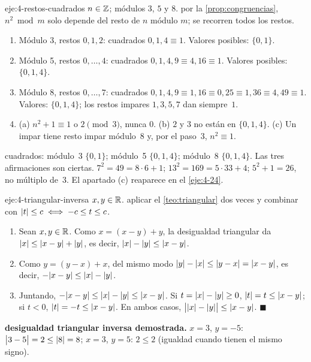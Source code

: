 \begin{solucion}{eje:4-restos-cuadrados}
\datos $n\in\mathbb{Z}$; módulos $3$, $5$ y $8$.
\planteamiento por la \cref{prop:congruencias}, $n^{2}\bmod m$ solo depende del resto de $n$ módulo $m$; se recorren todos los restos.
\pasos
\begin{enumerate}[label=\arabic*.]
  \item Módulo 3, restos $0,1,2$: cuadrados $0,1,4\equiv 1$. Valores posibles: $\{0,1\}$.
  \item Módulo 5, restos $0,\dots,4$: cuadrados $0,1,4,9\equiv 4,16\equiv 1$. Valores posibles: $\{0,1,4\}$.
  \item Módulo 8, restos $0,\dots,7$: cuadrados $0,1,4,9\equiv1,16\equiv0,25\equiv1,36\equiv4,49\equiv1$. Valores: $\{0,1,4\}$; los restos impares $1,3,5,7$ dan siempre~$1$.
  \item (a) $n^{2}+1\equiv 1$ o $2\pmod 3$, nunca $0$. (b) $2$ y $3$ no están en $\{0,1,4\}$. (c) Un impar tiene resto impar módulo~8 y, por el paso~3, $n^{2}\equiv 1$.
\end{enumerate}
\resultado cuadrados: módulo~3 $\{0,1\}$; módulo~5 $\{0,1,4\}$; módulo~8 $\{0,1,4\}$. Las tres afirmaciones son ciertas.
\comprobacion $7^{2}=49=8\cdot 6+1$; $13^{2}=169=5\cdot 33+4$; $5^{2}+1=26$, no múltiplo de~3. El apartado (c) reaparece en el \cref{eje:4-24}.
\end{solucion}

\begin{solucion}{eje:4-triangular-inversa}
\datos $x,y\in\mathbb{R}$.
\planteamiento aplicar el \cref{teo:triangular} dos veces y combinar con $\lvert t\rvert\le c\iff -c\le t\le c$.
\pasos
\begin{enumerate}[label=\arabic*.]
  \item Sean $x,y\in\mathbb{R}$. Como $x=(x-y)+y$, la desigualdad triangular da $\lvert x\rvert\le\lvert x-y\rvert+\lvert y\rvert$, es decir, $\lvert x\rvert-\lvert y\rvert\le\lvert x-y\rvert$.
  \item Como $y=(y-x)+x$, del mismo modo $\lvert y\rvert-\lvert x\rvert\le\lvert y-x\rvert=\lvert x-y\rvert$, es decir, $-\lvert x-y\rvert\le\lvert x\rvert-\lvert y\rvert$.
  \item Juntando, $-\lvert x-y\rvert\le\lvert x\rvert-\lvert y\rvert\le\lvert x-y\rvert$. Si $t=\lvert x\rvert-\lvert y\rvert\ge 0$, $\lvert t\rvert=t\le\lvert x-y\rvert$; si $t<0$, $\lvert t\rvert=-t\le\lvert x-y\rvert$. En ambos casos, $\bigl\lvert\lvert x\rvert-\lvert y\rvert\bigr\rvert\le\lvert x-y\rvert$. $\blacksquare$
\end{enumerate}
\resultado \textbf{desigualdad triangular inversa demostrada.}
\comprobacion $x=3$, $y=-5$: $\bigl\lvert 3-5\bigr\rvert=2\le\lvert8\rvert=8$; $x=3$, $y=5$: $2\le 2$ (igualdad cuando tienen el mismo signo).
\end{solucion}

